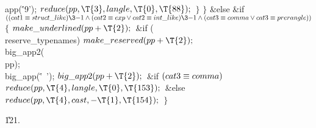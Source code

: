 \\{app}(\.{'9'});\6
${}\\{reduce}(\\{pp},\39\T{3},\39\\{langle},\39\T{0},\39\T{88});{}$\6
\4${}\}{}$\2\6
\4${}\}{}$\2\6
\&{else} \&{if} ${}((\\{cat1}\E\\{struct\_like})\3{-1}\W(\\{cat2}\E\\{exp}\V%
\\{cat2}\E\\{int\_like})\3{-1}\W(\\{cat3}\E\\{comma}\V\\{cat3}\E%
\\{prerangle})){}$\5
${}\{{}$\1\6
${}\\{make\_underlined}(\\{pp}+\T{2});{}$\6
\&{if} (\\{reserve\_typenames})\1\5
${}\\{make\_reserved}(\\{pp}+\T{2});{}$\2\6
\\{big\_app2}(\\{pp});\6
\\{big\_app}(\.{'\ '});\6
${}\\{big\_app2}(\\{pp}+\T{2});{}$\6
\&{if} ${}(\\{cat3}\equiv\\{comma}){}$\1\5
${}\\{reduce}(\\{pp},\39\T{4},\39\\{langle},\39\T{0},\39\T{153});{}$\2\6
\&{else}\1\5
${}\\{reduce}(\\{pp},\39\T{4},\39\\{cast},\39{-}\T{1},\39\T{154});{}$\2\6
\4${}\}{}$\2\par
\U121.\fi

